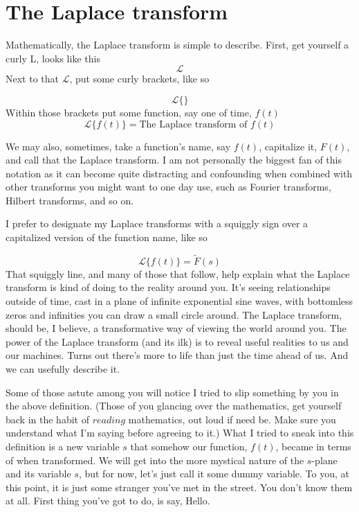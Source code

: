 \documentclass[11pt]{book}
\begin{document}
\section{The Laplace transform}
Mathematically, the Laplace transform is simple to describe. First, get yourself a curly L, looks like
this
\begin{equation}
	\mathcal{L}
\end{equation}
Next to that $\mathcal{L}$, put some curly brackets, like so

\begin{equation}
	\mathcal{L}\{\}
\end{equation}
Within those brackets put some function, say one of time, $f(t)$
\begin{equation}
	\mathcal{L}\{f(t)\} = \text{The Laplace transform of } f(t)
\end{equation}

We may also, sometimes, take a function's name, say $f(t)$, capitalize it, $F(t)$, and call that the Laplace transform. I am not personally the biggest fan of this notation as it can become quite distracting and confounding when combined with other transforms you might want to one day use, such as Fourier transforms, Hilbert transforms, and so on. 

I prefer to designate my Laplace transforms with a squiggly sign over a capitalized version of the function name, like so

\begin{equation}
	\mathcal{L}\{f(t)\} = \tilde{F}(s)
\end{equation}
That squiggly line, and many of those that follow, help explain what the Laplace transform is kind of doing to the reality around you. It's seeing relationships outside of time, cast in a plane of infinite exponential sine waves, with bottomless zeros and infinities you can draw a small circle around. The Laplace transform, should be, I believe, a transformative way of viewing the world around you. The power of the Laplace transform (and its ilk) is to reveal useful realities to us and our machines. Turns out there's more to life than just the time ahead of us. And we can usefully describe it. 

Some of those astute among you will notice I tried to slip something by you in the above definition. (Those of you glancing over the mathematics, get yourself back in the habit of $reading$ mathematics, out loud if need be. Make sure you understand what I'm saying before agreeing to it.) What I tried to sneak into this definition is a new variable $s$ that somehow our function, $f(t)$, became in terms of when transformed. We will get into the more mystical nature of the $s$-plane and its variable $s$, but for now, let's just call it some dummy variable. To you, at this point, it is just some stranger you've met in the street. You don't know them at all. First thing you've got to do, is say, Hello.
\end{document}
